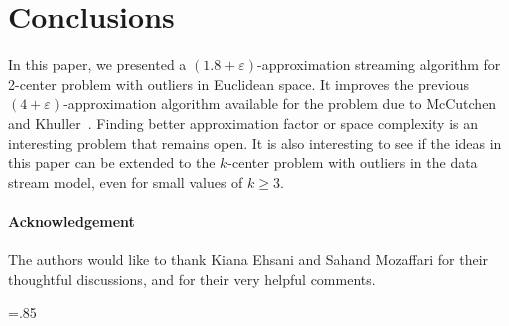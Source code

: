 \documentclass[envcountsame]{cls/cccg15}
\renewcommand{\O}{\ensuremath{{O}}}
\newcommand{\gee}{\geqslant}
\renewcommand{\ge}{\gee}
\newcommand{\eps}{\varepsilon}
\begin{document}
%


\section{Conclusions}
\label{sec:conc}

In this paper, we presented a $(1.8 + \eps)$-approximation streaming algorithm for 2-center problem with outliers in Euclidean space.
It improves the previous $(4+\eps)$-approximation algorithm available for the problem 
due to McCutchen and Khuller~\cite{mccutchen2008streaming}. 
Finding better approximation factor or space complexity
is an interesting problem that remains open.
It is also interesting to see if the ideas in this paper 
can be extended to the $k$-center problem with outliers in the data stream model,
even for small values of $k \ge 3$.

\paragraph{Acknowledgement}
The authors would like to thank Kiana Ehsani and Sahand Mozaffari 
for their thoughtful discussions, and for their very helpful comments.



{
\small
\baselineskip=.85\baselineskip


}


\newpage

\appendix 

\end{document}
